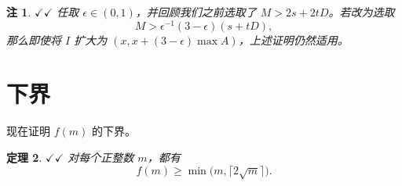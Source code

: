 \documentclass[UTF8,a4paper,oneside,openany,fontset=fandol,zihao=-4]{ctexbook}
\theoremstyle{chinesestyle}
\newtheorem{theorem}{定理}[section]
\newtheorem{remark}[theorem]{注}
\newcommand{\leanmark}{\ensuremath{\checkmark\!\checkmark}}
\begin{document}
\begin{remark}\label{rem:longer-interval}
\leanmark{} 任取 $\epsilon\in(0,1)$，并回顾我们之前选取了 $M>2s+2tD$。若改为选取
\[
M>\epsilon^{-1}(3-\epsilon)(s+tD),
\]
那么即使将 $I$ 扩大为 $(x,x+(3-\epsilon)\max A)$，上述证明仍然适用。
\end{remark}

\section{下界}

现在证明 $f(m)$ 的下界。

\begin{theorem}\label{thm:lower}
\leanmark{} 对每个正整数 $m$，都有
\[
  f(m)\geq \min\bigl(m,\lceil 2\sqrt m\rceil\bigr).
\]
\end{theorem}
\end{document}
